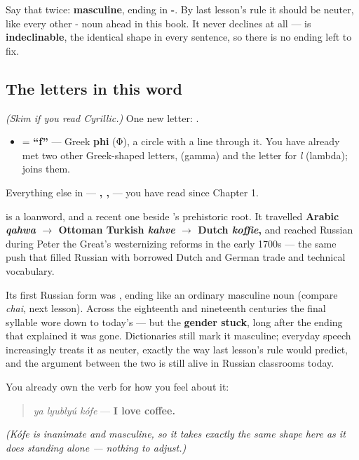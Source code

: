 Say that twice: \textbf{masculine}, ending in \textbf{-}. By last lesson's rule it should be neuter, like every other - noun ahead in this book. It never declines at all — \emph{} is \textbf{indeclinable}, the identical shape in every sentence, so there is no ending left to fix.

\subsection*{The letters in this word}
\emph{(Skim if you read Cyrillic.)} One new letter: \textbf{}.

\begin{itemize}
\raggedright
  \item \textbf{} = \textbf{\textquotedblleft{}f\textquotedblright{}} — Greek \textbf{phi} (Φ), a circle with a line through it. You have already met two other Greek-shaped letters, \textbf{} (gamma) and the letter for \emph{l} (lambda); \textbf{} joins them.
\end{itemize}

Everything else in \emph{} — \textbf{, , } — you have read since Chapter 1.

\begin{cousinweb}
\textbf{} is a loanword, and a recent one beside \emph{}'s prehistoric root. It travelled \textbf{Arabic \emph{qahwa} $\to$ Ottoman Turkish \emph{kahve} $\to$ Dutch \emph{koffie},} and reached Russian during Peter the Great's westernizing reforms in the early 1700s — the same push that filled Russian with borrowed Dutch and German trade and technical vocabulary.

Its first Russian form was \textbf{}, ending like an ordinary masculine noun (compare \emph{chai}, next lesson). Across the eighteenth and nineteenth centuries the final syllable wore down to today's \emph{} — but the \textbf{gender stuck}, long after the ending that explained it was gone. Dictionaries still mark it masculine; everyday speech increasingly treats it as neuter, exactly the way last lesson's rule would predict, and the argument between the two is still alive in Russian classrooms today.

You already own the verb for how you feel about it:

\begin{quote}
\emph{ya lyublyú kófe} — \textbf{I love coffee.}
\end{quote}

\emph{(Kófe is inanimate and masculine, so it takes exactly the same shape here as it does standing alone — nothing to adjust.)}
\end{cousinweb}

